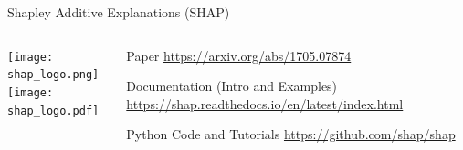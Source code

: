 \documentclass[ignorenonframetext,xcolor=x11names]{beamer}
\begin{document}
\begin{frame}{Shapley Additive Explanations (SHAP)}
\small
\begin{columns}
\begin{column}{0.25\textwidth}
\centering

\texttt{[image: shap\_logo.png]} \\

\vspace{\baselineskip}
\texttt{[image: shap\_logo.pdf]}
\end{column}
\begin{column}{0.75\textwidth}
\begin{block}{Paper}
\url{https://arxiv.org/abs/1705.07874}
\end{block}

\begin{block}{Documentation (Intro and Examples)}
\url{https://shap.readthedocs.io/en/latest/index.html}
\end{block}

\begin{block}{Python Code and Tutorials}
\url{https://github.com/shap/shap}
\end{block}
\end{column}
\end{columns}

\end{frame}


\end{document}
